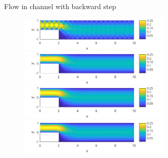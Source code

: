 \documentclass[10pt, compress]{beamer}
\begin{document}
\begin{frame}{Flow in channel with backward step}
  \begin{figure}
      \centering
      \includegraphics[width=0.65\textwidth]{StepVfield2.png}
      \includegraphics[width=0.65\textwidth]{StepVfield3.png}
      \includegraphics[width=0.65\textwidth]{StepVfield4.png}
      \includegraphics[width=0.65\textwidth]{StepVfield5.png}
      \label{fig:enter-label}
  \end{figure}  
\end{frame}
\end{document}
